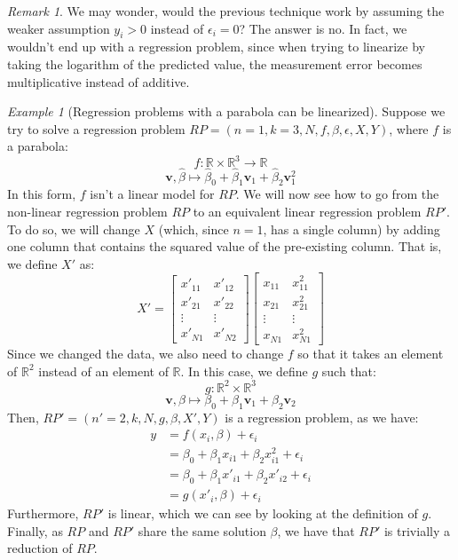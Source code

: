 \documentclass{article}
\theoremstyle{definition}
\theoremstyle{remark}
\newtheorem*{remark}{Remark}
\theoremstyle{example}
\newtheorem{example}{Example}[section]
\newcommand{\vv}{\mathbf{v}}
\newcommand{\betat}{\hat{\beta}}
\begin{document}
\begin{remark}
		We may wonder, would the previous technique work by assuming the weaker assumption $y_i > 0$ instead of $\epsilon_i = 0$? The answer is no. In fact, we wouldn't end up with a regression problem, since when trying to linearize by taking the logarithm of the predicted value, the measurement error becomes multiplicative instead of additive.
\end{remark}

\begin{example}[Regression problems with a parabola can be linearized]
		Suppose we try to solve a regression problem $RP = (n=1, k=3, N, f, \beta, \epsilon, X, Y)$, where $f$ is a parabola:
				$$f : \mathbb{R} \times \mathbb{R}^3 \rightarrow \mathbb{R}$$
				$$\vv, \betat \mapsto \betat_0 + \betat_1 \vv_1 + \betat_2 \vv_1^2$$
		In this form, $f$ isn't a linear model for $RP$. We will now see how to go from the non-linear regression problem $RP$ to an equivalent linear regression problem $RP'$. To do so, we will change $X$ (which, since $n=1$, has a single column) by adding one column that contains the squared value of the pre-existing column. That is, we define $X'$ as:
				$$X' = \begin{bmatrix} x'_{11} & x'_{12} \\ x'_{21} & x'_{22} \\ \vdots & \vdots \\ x'_{N1} & x'_{N2} \end{bmatrix} \begin{bmatrix} x_{11} & x_{11}^2 \\ x_{21} & x_{21}^2 \\ \vdots & \vdots \\ x_{N1} & x_{N1}^2 \end{bmatrix}$$
		Since we changed the data, we also need to change $f$ so that it takes an element of $\mathbb{R}^2$ instead of an element of $\mathbb{R}$. In this case, we define $g$ such that:
				$$g : \mathbb{R}^2 \times \mathbb{R}^3$$
				$$\vv, \beta \mapsto \beta_0 + \beta_1 \vv_1 + \beta_2 \vv_2$$
		Then, $RP' = (n'=2, k, N, g, \beta, X', Y)$ is a regression problem, as we have:
		\begin{align*}
				y &= f(x_i, \beta) + \epsilon_i\\
				  &= \beta_0 + \beta_1 x_{i1} + \beta_2 x_{i1}^2 + \epsilon_i\\
				  &= \beta_0 + \beta_1 x'_{i1} + \beta_2 x'_{i2} + \epsilon_i\\
				  &= g(x'_i, \beta) + \epsilon_i
		\end{align*}
		Furthermore, $RP'$ is linear, which we can see by looking at the definition of $g$. Finally, as $RP$ and $RP'$ share the same solution $\beta$, we have that $RP'$ is trivially a reduction of $RP$.
\end{example}
\end{document}
